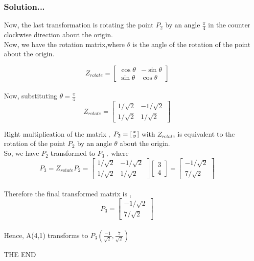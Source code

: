 \documentclass{beamer}
\begin{document}
\begin{frame}
\frametitle{Solution...}

Now, the last transformation is rotating the point $P_{2}$ by  an \break angle  \(\frac{\pi}{4} \) in the counter clockwise direction about the origin.\\
Now, we have the \break rotation matrix,where $\theta$ is the angle of the rotation of the \break point  about the origin.

\[Z_{rotate} = \begin{bmatrix} \cos{\theta} & -\sin{\theta} \\ \sin{\theta} & \cos{\theta}\end{bmatrix}\]
\\Now, substituting $ \theta = \frac{\pi}{4}$
\[Z_{rotate} = \begin{bmatrix} 1/\sqrt{2} & -1/\sqrt{2} \\ 1/\sqrt{2} & 1/\sqrt{2}\end{bmatrix}\]

    
    
\end{frame}
\begin{frame}
 Right multiplication of the matrix ,
 $P_{2}= \begin{bsmallmatrix} x\\y \end{bsmallmatrix}$ with  $Z_{rotate}$  is equivalent \break to the rotation  of the point  $ P_{2}$ by an angle $ \theta$ about the origin.\\
    So, we have $P_{2} $ transformed to $P_{3}$ , where \\
    \[P_{3} = Z_{rotate}P_{2} = \begin{bmatrix} 1/\sqrt{2} & -1/\sqrt{2} \\ 1/\sqrt{2} & 1/\sqrt{2}\end{bmatrix} \begin{bmatrix} 3 \\4 \end{bmatrix} = \begin{bmatrix} -1/\sqrt{2} \\7/\sqrt{2} \end{bmatrix}  \]\\
    Therefore the final transformed matrix is ,
    \[P_{3} =\begin{bmatrix} -1/\sqrt{2} \\7/\sqrt{2} \end{bmatrix}  \]\\ 
    Hence, A(4,1) transforms to $ P_{3}(  \frac{-1}{\sqrt{2}}, \frac{7}{\sqrt{2}} )$
\end{frame}

\begin{frame}
\quad\quad\quad  \quad\quad\quad\quad\quad\quad \quad\quad\quad \quad\quad  THE END
\end{frame}
\end{document}
